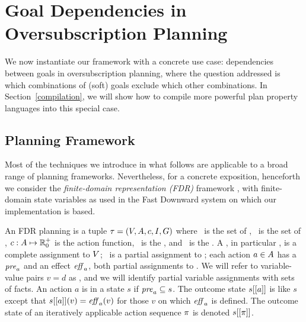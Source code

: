 \section{Goal Dependencies in Oversubscription Planning}
\label{goaldep}


We now instantiate our framework with a concrete use case:
dependencies between goals in oversubscription planning, where the
question addressed is which combinations of (soft) goals exclude which
other combinations. In Section~\ref{compilation}, we will show how to
compile more powerful plan property languages into this special case.




\subsection{Planning Framework}
\label{goaldep:planning}

Most of the techniques we introduce in what follows are applicable to
a broad range of planning frameworks. Nevertheless, for a concrete
exposition, henceforth we consider the \emph{finite-domain
  representation (FDR)} framework
\cite{backstrom:nebel:ci-95,helmert:ai-09}, with finite-domain state
variables as used in the Fast Downward system \cite{helmert:jair-06}
on which our implementation is based.

An FDR planning  is a tuple $\tau =
(V,A,{c},I,G)$ where \vars\ is the set of
, \acts\ is the set of , ${c}:
A \mapsto {\mathbb{R}}^+_0$ is the action  function,
\init\ is the , and \goal\ is the
. A , in particular \init, is a complete
assignment to $V$; \goal\ is a partial assignment to \vars; each
action $a \in A$ has a  $\mathit{pre}_a$ and an
effect $\mathit{eff}_a$, both partial assignments to \vars. We will refer to
variable-value pairs $v=d$ as , and we will identify
partial variable assignments with sets of facts.
%
An action $a$ is  in a state $s$ if $\mathit{pre}_a
\subseteq s$. The outcome state $s[[a]]$ is like $s$ except that
$s[[a]](v) = \mathit{eff}_a(v)$ for those $v$ on which $\mathit{eff}_a$ is
defined. The outcome state of an iteratively applicable action
sequence $\pi$ is denoted $s[[\pi]]$.

